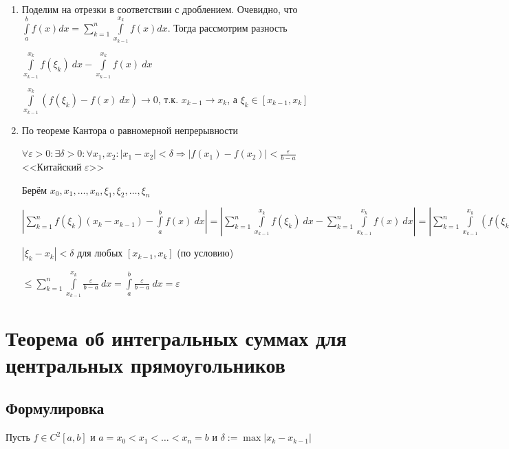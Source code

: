 \documentclass{article}
\begin{document}
		\begin{enumerate}
			\item Поделим на отрезки в соответствии с дроблением. Очевидно, что $\int\limits^b_a f(x) dx = \sum\limits^n_{k = 1} \int\limits^{x_k}_{x_{k - 1}} f(x) dx$. Тогда рассмотрим разность

				$\int\limits^{x_k}_{x_{k - 1}} f(\xi_k) \ dx - \int\limits^{x_k}_{x_{k - 1}} f(x) \ dx$

				$\int\limits^{x_k}_{x_{k - 1}} (f(\xi_k) - f(x) \ dx) \rightarrow 0$, т.к. $x_{k - 1} \rightarrow x_k$, а $\xi_k \in [x_{k - 1}, x_k]$

			\item По теореме Кантора о равномерной непрерывности

				$\forall \varepsilon > 0 : \exists \delta > 0 : \forall x_1, x_2 : \left| x_1 - x_2 \right| < \delta \Longrightarrow \left| f(x_1) - f(x_2) \right| < \frac{\varepsilon}{b - a}$ <<Китайский $\varepsilon$>>

				Берём $x_0, x_1, \ldots, x_n, \xi_1, \xi_2, \ldots, \xi_n$

				$\left| \sum\limits^n_{k = 1} f(\xi_k)(x_k - x_{k - 1}) - \int\limits^b_a f(x) \ dx \right| = \left| \sum\limits^n_{k = 1} \int\limits^{x_k}_{x_{k - 1}} f(\xi_k) \ dx - \sum\limits^n_{k = 1} \int\limits^{x_k}_{x_{k - 1}}f(x) \ dx \right| = \left| \sum\limits^n_{k = 1} \int\limits^{x_k}_{x_{k - 1}} \left( f(\xi_k) - f(x) \right) \ dx \right| \leq \sum\limits^n_{k = 1} \int\limits^{x_k}_{x_{k - 1}} \left| f(\xi_k) - f(x) \right| \ dx$

				$\left| \xi_k - x_k \right| < \delta$ для любых $[x_{k - 1}, x_k]$ (по условию)

				$\leq \sum\limits^n_{k = 1} \int\limits^{x_k}_{x_{k - 1}} \frac{\varepsilon}{b - a} \ dx = \int\limits^b_a \frac{\varepsilon}{b - a} \ dx = \varepsilon$

		\end{enumerate}

	\newpage

	\section{Теорема об интегральных суммах для центральных прямоугольников}

		\subsection{Формулировка}

			Пусть $f \in C^2[a, b]$ и $a = x_0 < x_1 < \ldots < x_n = b$ и $\delta := \max \left| x_k - x_{k - 1} \right|$
\end{document}
